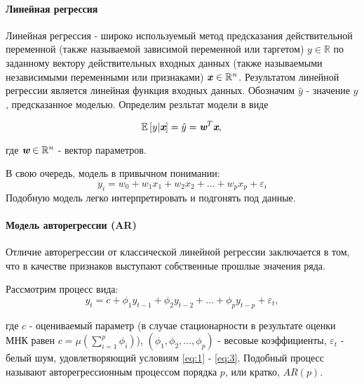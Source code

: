 \paragraph{Линейная регрессия}

Линейная регрессия - широко используемый метод предсказания действительной 
переменной (также называемой зависимой переменной или таргетом) $y \in \mathbb{R}$ 
по заданному вектору действительных входных данных (также называемыми 
независимыми переменными или признаками) $\textbf{\textit{x}} \in \mathbb{R}^n$. Результатом 
линейной регрессии является линейная функция входных данных. Обозначим $\hat{y}$ - 
значение $y$, предсказанное моделью. Определим резльтат модели в виде

\begin{equation*}
    \mathbb{E} \left[ y | \textit{\textbf{x}} \right] = \hat{y} = 
    \textit{\textbf{w}}^T \textit{\textbf{x}}, \\
\end{equation*}

где $\textit{\textbf{w}} \in \mathbb{R}^n$ - вектор параметров. 

В свою очередь, модель в привычном понимании:
\begin{equation*}
    y_i = w_0 + w_1 x_1 + w_2 x_2 + \dots + w_p x_p + \varepsilon_i
\end{equation*}
Подобную модель легко интерпретировать и подгонять под данные.

\paragraph{Модель авторегрессии (AR)}

Отличие авторегрессии от классической линейной регрессии заключается в том, 
что в качестве \guillemotleft признаков\guillemotright {} выступают 
собственные прошлые значения ряда.

Рассмотрим процесс вида:
\begin{equation*}
    y_t = c + \phi_1 y_{t-1} + \phi_2 y_{t-2} + \dots + \phi_p y_{t-p} + \varepsilon_t,
\end{equation*}

где $c$ - оцениваемый параметр (в случае стационарности в результате оценки МНК равен 
$c = \mu (\sum_{i=1}^p \phi_i)$), 
$(\phi_1, \phi_2, ..., \phi_p)$ - весовые коэффициенты, $\varepsilon_t$ - 
белый шум, удовлетворяющий условиям \eqref{eq:1} - \eqref{eq:3}. Подобный процесс 
называют авторегрессионным процессом порядка $p$, или кратко, $AR(p)$.

